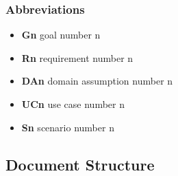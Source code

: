 \subsubsection{Abbreviations}
\begin{itemize}
        \item \textbf{Gn} goal number n
        \item \textbf{Rn} requirement number n
        \item \textbf{DAn} domain assumption number n
        \item \textbf{UCn} use case number n
        \item \textbf{Sn} scenario number n
\end{itemize}

\subsection{Document Structure}
